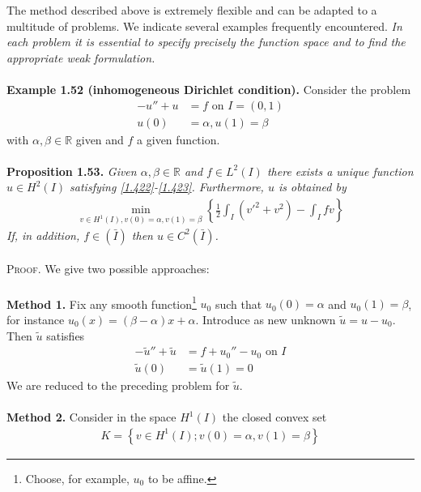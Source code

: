 \documentclass[a4paper,oneside]{article}
\numberwithin{equation}{section}
\begin{document}
The method described above is extremely flexible and can be adapted to a multitude of problems. We indicate several examples frequently encountered. \textit{In each problem it is essential to specify precisely the function space and to find the appropriate weak formulation.}\\
\\
\textbf{Example 1.52 (inhomogeneous Dirichlet condition).} Consider the problem
\begin{align}
\label{1.422}
 - u'' + u &= f\mbox{ on } I = \left( {0,1} \right)\\
u\left( 0 \right) &= \alpha ,u\left( 1 \right) = \beta \label{1.423}
\end{align}
with $\alpha,\beta\in \mathbb{R}$ given and $f$ a given function.\\
\\
\textbf{Proposition 1.53.} \textit{Given $\alpha,\beta \in \mathbb{R}$ and $f\in L^2\left(I\right)$ there exists a unique function $u\in H^2\left(I\right)$ satisfying \eqref{1.422}-\eqref{1.423}. Furthermore, $u$ is obtained by}
\begin{align}
\mathop {\min }\limits_{v \in {H^1}\left( I \right),v\left( 0 \right) = \alpha ,v\left( 1 \right) = \beta } \left\{ {\frac{1}{2}\int_I {\left( {v{'^2} + {v^2}} \right)}  - \int_I {fv} } \right\}
\end{align} 
\textit{If, in addition, $f\in \left(\bar I\right)$ then $u\in C^2\left(\bar I\right)$.}\\
\\
\textsc{Proof.} We give two possible approaches:\\
\\
\textbf{Method 1.} Fix any smooth function\footnote{Choose, for example, $u_0$ to be affine.} $u_0$ such that $u_0\left(0\right)=\alpha$ and $u_0\left(1\right)=\beta$, for instance ${u_0}\left( x \right) = \left( {\beta  - \alpha } \right)x + \alpha $. Introduce as new unknown $\tilde{u}=u-u_0$. Then $\tilde{u}$ satisfies
\begin{align}
 - \tilde u'' + \tilde u &= f + {u_0}'' - {u_0}\mbox{ on } I\\
\tilde u\left( 0 \right) &= \tilde u\left( 1 \right) = 0
\end{align}
We are reduced to the preceding problem for $\tilde{u}$.\\
\\
\textbf{Method 2.} Consider in the space $H^1\left(I\right)$ the closed convex set
\begin{align}
\label{1.427}
K = \left\{ {v \in {H^1}\left( I \right);v\left( 0 \right) = \alpha ,v\left( 1 \right) = \beta } \right\}
\end{align}
\end{document}
